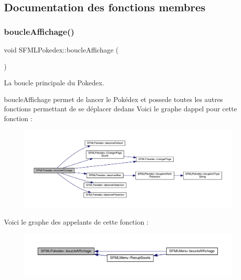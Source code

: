 \subsection{Documentation des fonctions membres}
\mbox{\label{class_s_f_m_l_pokedex_a7caf472eeb1060d9ce88c7cf3cb4bbb8}} 
\subsubsection{\texorpdfstring{boucle\+Affichage()}{boucleAffichage()}}
{\footnotesize\ttfamily void S\+F\+M\+L\+Pokedex\+::boucle\+Affichage (\begin{DoxyParamCaption}{ }\end{DoxyParamCaption})}



La boucle principale du Pokedex. 

boucle\+Affichage permet de lancer le Pokédex et possede toutes les autres fonctions permettant de se déplacer dedans Voici le graphe d\textquotesingle{}appel pour cette fonction \+:\nopagebreak
\begin{figure}[H]
\begin{center}
\leavevmode
\includegraphics[width=350pt]{class_s_f_m_l_pokedex_a7caf472eeb1060d9ce88c7cf3cb4bbb8_cgraph}
\end{center}
\end{figure}
Voici le graphe des appelants de cette fonction \+:\nopagebreak
\begin{figure}[H]
\begin{center}
\leavevmode
\includegraphics[width=350pt]{class_s_f_m_l_pokedex_a7caf472eeb1060d9ce88c7cf3cb4bbb8_icgraph}
\end{center}
\end{figure}
\mbox{\label{class_s_f_m_l_pokedex_a0b447d5b74964d395264d6d5e50aadbd}} 
